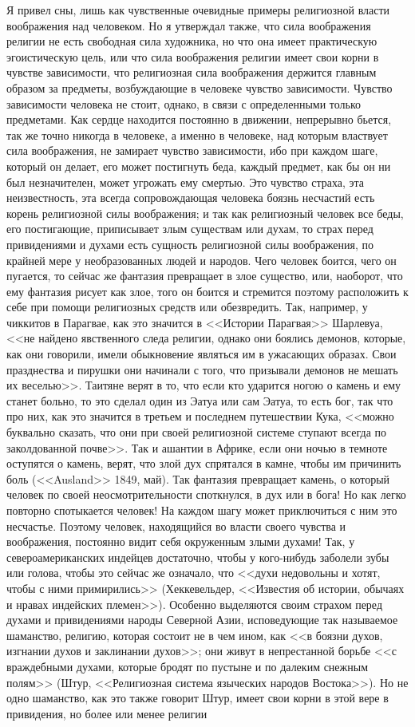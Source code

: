 \documentclass[12pt]{article}
\begin{document}
Я привел сны, лишь как чувственные очевидные примеры религиозной власти воображения над человеком. Но я утверждал также, что сила воображения религии не есть свободная сила художника, но что она имеет практическую эгоистическую цель, или что сила воображения религии имеет свои корни в чувстве зависимости, что религиозная сила воображения держится главным образом за предметы, возбуждающие в человеке чувство зависимости. Чувство зависимости человека не стоит, однако, в связи с определенными только предметами. Как сердце находится постоянно в движении, непрерывно бьется, так же точно никогда в человеке, а именно в человеке, над которым властвует сила воображения, не замирает чувство зависимости, ибо при каждом шаге, который он делает, его может постигнуть беда, каждый предмет, как бы он ни был незначителен, может угрожать ему смертью. Это чувство страха, эта неизвестность, эта всегда сопровождающая человека боязнь несчастий есть корень религиозной силы воображения; и так как религиозный человек все беды, его постигающие, приписывает злым существам или духам, то страх перед привидениями и духами есть сущность религиозной силы воображения, по крайней мере у необразованных людей и народов. Чего человек боится, чего он пугается, то сейчас же фантазия превращает в злое существо, или, наоборот, что ему фантазия рисует как злое, того он боится и стремится поэтому расположить к себе при помощи религиозных средств или обезвредить. Так, например, у чиккитов в Парагвае, как это значится в <<Истории Парагвая>> Шарлевуа, <<не найдено явственного следа религии, однако они боялись демонов, которые, как они говорили, имели обыкновение являться им в ужасающих образах. Свои празднества и пирушки они начинали с того, что призывали демонов не мешать их веселью>>. Таитяне верят в то, что если кто ударится ногою о камень и ему станет больно, то это сделал один из Эатуа или сам Эатуа, то есть бог, так что про них, как это значится в третьем и последнем путешествии Кука, <<можно буквально сказать, что они при своей религиозной системе ступают всегда по заколдованной почве>>. Так и ашантии в Африке, если они ночью в темноте оступятся о камень, верят, что злой дух спрятался в камне, чтобы им причинить боль (<<Ausland>>  1849, май). Так фантазия превращает камень, о который человек по своей неосмотрительности споткнулся, в дух или в бога! Но как легко повторно спотыкается человек! На каждом шагу может приключиться с ним это несчастье. Поэтому человек, находящийся во власти своего чувства и воображения, постоянно видит себя окруженным злыми духами! Так, у североамериканских индейцев достаточно, чтобы у кого-нибудь заболели зубы или голова, чтобы это сейчас же означало, что <<духи недовольны и хотят, чтобы с ними примирились>> (Хеккевельдер, <<Известия об истории, обычаях и нравах индейских племен>>). Особенно выделяются своим страхом перед духами и привидениями народы Северной Азии, исповедующие так называемое шаманство, религию, которая состоит не в чем ином, как <<в боязни духов, изгнании духов и заклинании духов>>; они живут в непрестанной борьбе <<с враждебными духами, которые бродят по пустыне и по далеким снежным полям>> (Штур, <<Религиозная система языческих народов Востока>>). Но не одно шаманство, как это также говорит Штур, имеет свои корни в этой вере в привидения, но более или менее религии 
\end{document}
